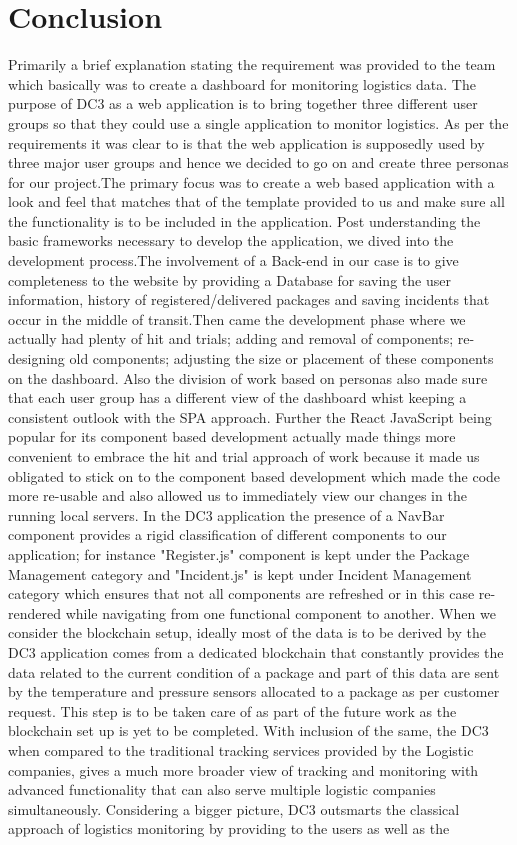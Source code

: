 \chapter{Conclusion}
\label{cha:conclusion}

Primarily a brief explanation stating the requirement was provided to the team which basically was to create a dashboard for monitoring logistics data.
The purpose of DC3 as a web application is to bring together three different user groups so that they could use a single application to monitor logistics. As per the requirements it was clear to is that the web application is supposedly used by three major user groups and hence we decided to go on and create three personas for our project.The primary focus was to create a web based application with a look and feel that matches that of the template provided to us and make sure all the functionality is to be included in the application. Post understanding the basic frameworks necessary to develop the application, we dived into the development process.The involvement of a Back-end in our case is to give completeness to the website by providing a Database for saving the user information, history of registered/delivered packages and saving incidents that occur in the middle of transit.Then came the development phase where we  actually had plenty of hit and trials; adding and removal of components; re-designing old components; adjusting the size or placement of these components on the dashboard. Also the division of work based on personas also made sure that each user group has a different view of the dashboard whist keeping a consistent outlook with the SPA approach. Further the React JavaScript being popular for its component based development actually made things more convenient to embrace the hit and trial approach of work because it made us obligated to stick on to the component based development which made the code more re-usable and also allowed us to immediately view our changes in the running local servers. In the DC3 application the presence of a NavBar component provides a rigid classification of different components to our application; for instance "Register.js" component is kept under the Package Management category and "Incident.js" is kept under Incident Management category which ensures that not all components are refreshed or in this case re-rendered while navigating from one functional component to another. When we consider the blockchain setup, ideally most of the data is to be derived by the DC3 application comes from a dedicated blockchain that constantly provides the data related to the current condition of a package and part of this data are sent by the temperature and pressure sensors allocated to a package as per customer request. This step is to be taken care of as part of the future work as the blockchain set up is yet to be completed. With inclusion of the same, the DC3 when compared to the traditional tracking services provided by the Logistic companies, gives a much more broader view of tracking and monitoring with advanced functionality that can also serve multiple logistic companies simultaneously. Considering a bigger picture, DC3 outsmarts the classical approach of logistics monitoring by providing to the users as well as the 